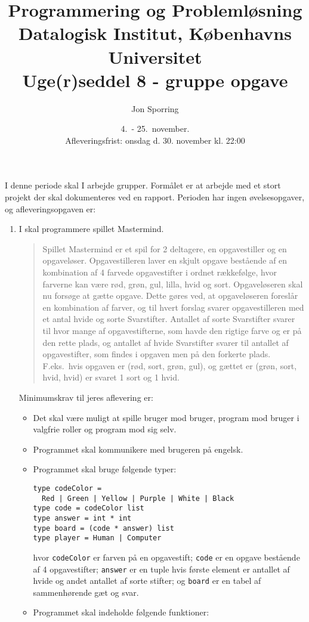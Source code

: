 \documentclass[a4paper,12pt]{article}
\title{Programmering og Problemløsning\\Datalogisk Institut,
  Københavns Universitet\\Uge(r)seddel 8 - gruppe opgave}
\author{Jon Sporring}
\date{4.\ - 25.\ november.\\Afleveringsfrist: onsdag d. 30. november kl. 22:00}
\begin{document}
\maketitle

I denne periode skal I arbejde grupper. Formålet er at arbejde med et stort projekt der skal dokumenteres ved en rapport. Perioden har ingen øvelsesopgaver, og afleveringsopgaven er:
\begin{enumerate}[label=8g.\arabic*,start=0]
\item I skal programmere spillet Mastermind. 
  \begin{quote}
    Spillet Mastermind er et spil for 2 deltagere, en opgavestiller og en opgaveløser. Opgavestilleren laver en skjult opgave bestående af en kombination af 4 farvede opgavestifter i ordnet rækkefølge, hvor farverne kan være rød, grøn, gul, lilla, hvid og sort. Opgaveløseren skal nu forsøge at gætte opgave. Dette gøres ved, at opgaveløseren foreslår en kombination af farver, og til hvert forslag svarer opgavestilleren med et antal hvide og sorte Svarstifter. Antallet af sorte Svarstifter svarer til hvor mange af opgavestifterne, som havde den rigtige farve og er på den rette plads, og antallet af hvide Svarstifter svarer til antallet af opgavestifter, som findes i opgaven men på den forkerte plads. F.eks.\ hvis opgaven er (rød, sort, grøn, gul), og gættet er (grøn, sort, hvid, hvid) er svaret 1 sort og 1 hvid.
  \end{quote}
  Minimumskrav til jeres aflevering er:
  \begin{itemize}
  \item Det skal være muligt at spille bruger mod bruger, program mod bruger i valgfrie roller og program mod sig selv.
  \item Programmet skal kommunikere med brugeren på engelsk.
  \item Programmet skal bruge følgende typer:
    \begin{lstlisting}
type codeColor = 
  Red | Green | Yellow | Purple | White | Black
type code = codeColor list
type answer = int * int
type board = (code * answer) list
type player = Human | Computer
  \end{lstlisting}
hvor \lstinline!codeColor! er farven på en opgavestift; \lstinline!code! er en opgave bestående af 4 opgavestifter; \lstinline!answer! er en tuple hvis første element er antallet af hvide og andet antallet af sorte stifter; og \lstinline!board! er en tabel af sammenhørende gæt og svar.
\item Programmet skal indeholde følgende funktioner:

\end{itemize}
\end{enumerate}
\end{document}
